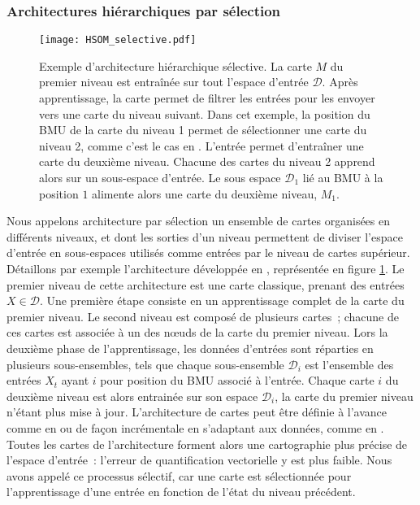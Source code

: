 \documentclass[../main]{subfiles}
\begin{document}
\subsubsection{Architectures hiérarchiques par sélection}

\begin{figure}
    \texttt{[image: HSOM\_selective.pdf]}
    \caption{Exemple d'architecture hiérarchique sélective. La carte $M$ du premier niveau est entraînée sur tout l'espace d'entrée $\mathcal{D}$. Après apprentissage, la carte permet de filtrer les entrées pour les envoyer vers une carte du niveau suivant. Dans cet exemple, la position du BMU de la carte du niveau 1 permet de sélectionner une carte du niveau 2, comme c'est le cas en \cite{barbalho_hierarchical_2001}. 
    L'entrée permet d'entraîner une carte du deuxième niveau. Chacune des cartes du niveau 2 apprend alors sur un sous-espace d'entrée. Le sous espace $\mathcal{D}_1$ lié au BMU à la position $1$ alimente alors une carte du deuxième niveau, $M_1$.
    \label{fig:hsom_selective}}
\end{figure}

Nous appelons architecture par sélection un ensemble de cartes organisées en différents niveaux, et dont les sorties d'un niveau permettent de diviser l'espace d'entrée en sous-espaces utilisés comme entrées par le niveau de cartes supérieur. Détaillons par exemple l'architecture développée en \cite{barbalho_hierarchical_2001}, représentée en figure \ref{fig:hsom_selective}. 
Le premier niveau de cette architecture est une carte classique, prenant des entrées $X \in \mathcal{D}$.
Une première étape consiste en un apprentissage complet de la carte du premier niveau.
Le second niveau est composé de plusieurs cartes~; chacune de ces cartes est associée à un des n\oe{}uds de la carte du premier niveau.
Lors la deuxième phase de l'apprentissage, les données d'entrées sont réparties en plusieurs sous-ensembles, tels que chaque sous-ensemble $\mathcal{D}_i$ est l'ensemble des entrées $X_t$ ayant $i$ pour position du BMU associé à l'entrée.
Chaque carte $i$ du deuxième niveau est alors entrainée sur son espace $\mathcal{D}_i$, la carte du premier niveau n'étant plus mise à jour.
L'architecture de cartes peut être définie à l'avance comme en \cite{barbalho_hierarchical_2001} ou de façon incrémentale en s'adaptant aux données, comme en \cite{Costa2016ANS}.
Toutes les cartes de l'architecture forment alors une cartographie plus précise de l'espace d'entrée~: l'erreur de quantification vectorielle y est plus faible.
Nous avons appelé ce processus sélectif, car une carte est sélectionnée pour l'apprentissage d'une entrée en fonction de l'état du niveau précédent.
\end{document}
